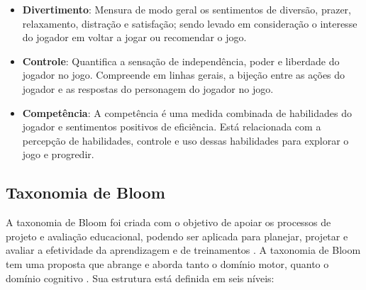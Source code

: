 \begin{itemize}[label={},leftmargin=2em]
\item \textbf{Divertimento}: Mensura de modo geral os sentimentos de diversão, prazer, relaxamento, distração e satisfação; sendo levado em consideração o interesse do jogador em voltar a jogar ou recomendar o jogo.
\end{itemize}

\begin{itemize}[label={},leftmargin=2em]
\item \textbf{Controle}: Quantifica a sensação de independência, poder e liberdade do jogador no jogo. Compreende em linhas gerais, a bijeção entre as ações do jogador e as respostas do personagem do jogador no jogo. 
\end{itemize}

\begin{itemize}[label={},leftmargin=2em]
\item \textbf{Competência}: A competência é uma medida combinada de habilidades do jogador e sentimentos positivos de eficiência. Está relacionada com a percepção de habilidades, controle e uso dessas habilidades para explorar o jogo e progredir.
\end{itemize}




\subsection{Taxonomia de Bloom}
\label{Bloom}

A taxonomia de Bloom foi criada com o objetivo de apoiar os processos de projeto e avaliação educacional, podendo ser aplicada para planejar, projetar e avaliar a efetividade da aprendizagem e de treinamentos \cite{bloom1956taxonomy}. A taxonomia de Bloom tem uma proposta que abrange e aborda tanto o domínio motor, quanto o domínio cognitivo \cite{moody2003evaluating}. Sua estrutura está definida em seis níveis:

